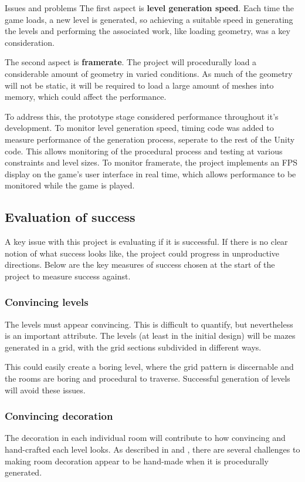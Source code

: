 \documentclass[progress]{cmpreport}
\begin{document}
\begin{section}{Issues and problems}
The first aspect is \textbf{level generation speed}. Each time the game loads, a new level is generated, so achieving a suitable speed in generating the levels and performing the associated work, like loading geometry, was a key consideration.

The second aspect is \textbf{framerate}. The project will procedurally load a considerable amount of geometry in varied conditions. As much of the geometry will not be static, it will be required to load a large amount of meshes into memory, which could affect the performance.  

To address this, the prototype stage considered performance throughout it's development. To monitor level generation speed, timing code was added to measure performance of the generation process, seperate to the rest of the Unity code. This allows monitoring of the procedural process and testing at various constraints and level sizes. To monitor framerate, the project implements an FPS display on the game's user interface in real time, which allows performance to be monitored while the game is played. 


\subsection{Evaluation of success} \label{evalsuccess}
A key issue with this project is evaluating if it is successful. If there is no clear notion of what success looks like, the project could progress in unproductive directions. Below are the key measures of success chosen at the start of the project to measure success against.

\subsubsection{Convincing levels}
The levels must appear convincing. This is difficult to quantify, but nevertheless is an important attribute. The levels (at least in the initial design) will be mazes generated in a grid, with the grid sections subdivided in different ways.

This could easily create a boring level, where the grid pattern is discernable and the rooms are boring and procedural to traverse. Successful generation of levels will avoid these issues.

\subsubsection{Convincing decoration}
The decoration in each individual room will contribute to how convincing and hand-crafted each level looks. As described in \cite{doi:10.1111/j.1467-8659.2009.01351.x} and \cite{taylor-parberry}, there are several challenges to making room decoration appear to be hand-made when it is procedurally generated. 


\end{section}
\end{document}
